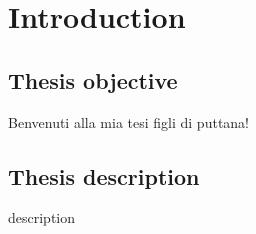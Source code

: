 \chapter{Introduction} \label{ch:intro}

\section{Thesis objective} 

Benvenuti alla mia tesi figli di puttana!

\section{Thesis description}

description \cite{noms2020}